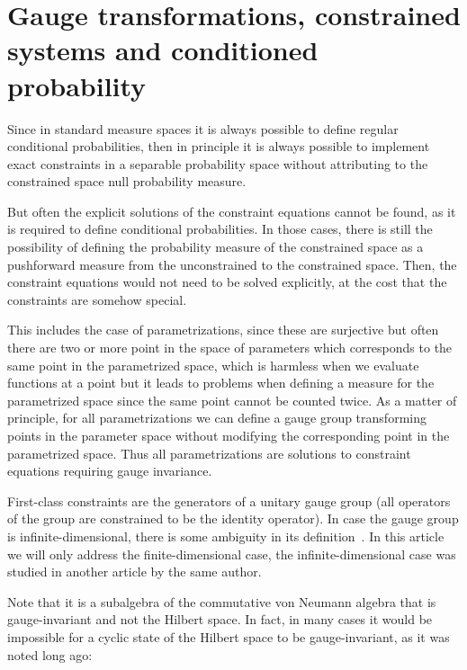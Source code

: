 \documentclass[11pt]{book}
\begin{document}
\hypertarget{gauge-transformations-constrained-systems-and-conditioned-probability}{%
\section{Gauge transformations, constrained systems and conditioned
probability}\label{gauge-transformations-constrained-systems-and-conditioned-probability}}

Since in standard measure spaces it is always possible to define regular
conditional
probabilities\cite{durrett2019probability}, then in principle it is always possible to implement exact
constraints in a separable probability space without attributing to the
constrained space null probability measure.

But often the explicit solutions of the constraint equations cannot be
found\cite{SEILER1998561}, as it is
required to define conditional probabilities. In those cases, there is
still the possibility of defining the probability measure of the
constrained space as a pushforward measure from the unconstrained to the
constrained space. Then, the constraint equations would not need to be
solved explicitly, at the cost that the constraints are somehow special.

This includes the case of parametrizations, since these are surjective
but often there are two or more point in the space of parameters which
corresponds to the same point in the parametrized
space\cite{paramanifold}, which is
harmless when we evaluate functions at a point but it leads to problems
when defining a measure for the parametrized space since the same point
cannot be counted twice. As a matter of
principle\cite{norton_2003}, for all
parametrizations we can define a gauge group transforming points in the
parameter space without modifying the corresponding point in the
parametrized space. Thus all parametrizations are solutions to
constraint equations requiring gauge invariance.

First-class constraints are the generators of a unitary gauge group (all
operators of the group are constrained to be the identity operator). In
case the gauge group is infinite-dimensional, there is some ambiguity in
its definition~\cite{Rudolf2010Infinite}\cite{infinitelie2}. In this
article we will only address the finite-dimensional case, the
infinite-dimensional case was studied in another article by the same
author.

Note that it is a subalgebra of the commutative von Neumann algebra that
is gauge-invariant and not the Hilbert space. In fact, in many cases it
would be impossible for a cyclic state of the Hilbert space to be
gauge-invariant, as it was noted long ago:
\end{document}
